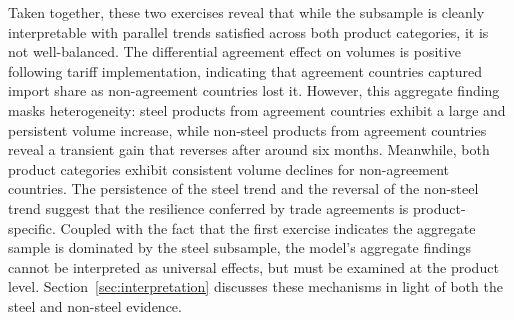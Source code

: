 Taken together, these two exercises reveal that while the subsample is cleanly interpretable with parallel trends satisfied across both product categories, it is not well-balanced. The differential agreement effect on volumes is positive following tariff implementation, indicating that agreement countries captured import share as non-agreement countries lost it. However, this aggregate finding masks heterogeneity: steel products from agreement countries exhibit a large and persistent volume increase, while non-steel products from agreement countries reveal a transient gain that reverses after around six months. Meanwhile, both product categories exhibit consistent volume declines for non-agreement countries. The persistence of the steel trend and the reversal of the non-steel trend suggest that the resilience conferred by trade agreements is product-specific. Coupled with the fact that the first exercise indicates the aggregate sample is dominated by the steel subsample, the model's aggregate findings cannot be interpreted as universal effects, but must be examined at the product level. Section~\ref{sec:interpretation} discusses these mechanisms in light of both the steel and non-steel evidence.


